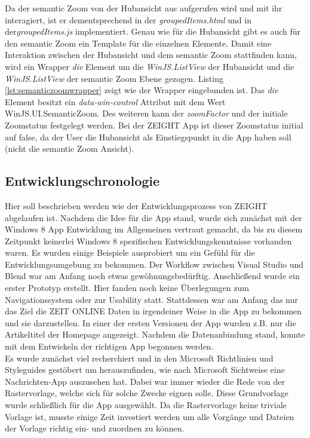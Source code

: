 \documentclass[12pt,a4paper,bibtotoc,abstracton]{scrartcl}
\begin{document}
Da der semantic Zoom von der Hubansicht aus aufgerufen wird und mit ihr interagiert, ist er dementsprechend in der \textit{groupedItems.html} und in der\textit{groupedItems.js} implementiert. Genau wie für die Hubansicht gibt es auch für den semantic Zoom ein Template für die einzelnen Elemente. Damit eine Interaktion zwischen der Hubansicht und dem semantic Zoom stattfinden kann, wird ein Wrapper \textit{div} Element um die \textit{WinJS.ListView} der Hubansicht und die \textit{WinJS.ListView} der semantic Zoom Ebene gezogen. Listing \ref{lst:semanticzoomwrapper} zeigt wie der Wrapper eingebunden ist. Das \textit{div} Element besitzt ein \textit{data-win-control} Attribut mit dem Wert \glqq WinJS.UI.SemanticZoom\grqq. Des weiteren kann der \textit{zoomFactor} und der initiale Zoomstatus festgelegt werden. Bei der ZEIGHT App ist dieser Zoomstatus initial auf false, da der User die Hubansicht als Einstiegspunkt in die App haben soll (nicht die semantic Zoom Ansicht).

\begin{minipage}{\linewidth}
  
\end{minipage}

\subsection{Entwicklungschronologie}
\label{subsec:entwicklungschronologie}
Hier soll beschrieben werden wie der Entwicklungsprozess von ZEIGHT abgelaufen ist. Nachdem die Idee für die App stand, wurde sich zunächst mit der Windows 8 App Entwicklung im Allgemeinen vertraut gemacht, da bis zu diesem Zeitpunkt keinerlei Windows 8 spezifischen Entwicklungskenntnisse vorhanden waren. Es wurden einige Beispiele ausprobiert um ein Gefühl für die Entwicklungsumgebung zu bekommen. Der Workflow zwischen Visual Studio und Blend war am Anfang noch etwas gewöhnungsbedürftig. Anschließend wurde ein erster Prototyp erstellt. Hier fanden noch keine Überlegungen zum Navigationssystem oder zur Usability  statt. Stattdessen war am Anfang das nur das Ziel die ZEIT ONLINE Daten in irgendeiner Weise in die App zu bekommen und sie darzustellen. In einer der ersten Versionen der App wurden z.B. nur die Artikeltitel der Homepage angezeigt. Nachdem die Datenanbindung stand, konnte mit dem Entwickeln der richtigen App begonnen werden.\\

Es wurde zunächst viel recherchiert und in den Microsoft Richtlinien und Styleguides gestöbert um herauszufinden, wie nach Microsoft Sichtweise eine Nachrichten-App auszusehen hat. Dabei war immer wieder die Rede von der Rastervorlage, welche sich für solche Zwecke eignen solle. Diese Grundvorlage wurde schließlich für die App ausgewählt. Da die Rastervorlage keine triviale Vorlage ist, musste einige Zeit investiert werden um alle Vorgänge und Dateien der Vorlage richtig ein- und zuordnen zu können. \\
\end{document}
